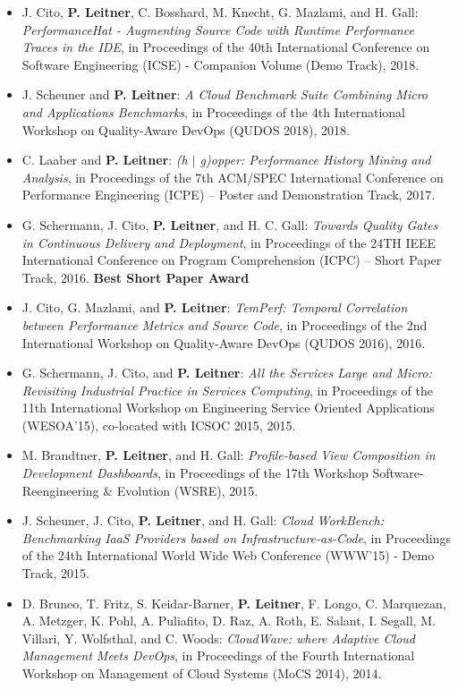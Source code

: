 \documentclass[paper=letter,fontsize=11pt]{scrartcl} %
\begin{document}
\begin{itemize}
	\item J. Cito, \textbf{P. Leitner}, C. Bosshard, M. Knecht, G. Mazlami, and H. Gall: \emph{PerformanceHat - Augmenting Source Code with Runtime Performance Traces in the IDE}, in Proceedings of the 40th International Conference on Software Engineering (ICSE) - Companion Volume (Demo Track), 2018.
	\item J. Scheuner and \textbf{P. Leitner}: \emph{A Cloud Benchmark Suite Combining Micro and Applications Benchmarks}, in Proceedings of the 4th International Workshop on Quality-Aware DevOps (QUDOS 2018), 2018.
	\item C. Laaber and \textbf{P. Leitner}: \emph{ (h $|$ g)opper: Performance History Mining and Analysis},  in Proceedings of the 7th ACM/SPEC International Conference on Performance Engineering (ICPE) -- Poster and Demonstration Track, 2017.
	\item G. Schermann, J. Cito, \textbf{P. Leitner}, and H. C. Gall: \emph{Towards Quality Gates in Continuous Delivery and Deployment}, in Proceedings of the 24TH IEEE International Conference on Program Comprehension (ICPC) – Short Paper Track, 2016. \textbf{Best Short Paper Award}
	\item J. Cito, G. Mazlami, and \textbf{P. Leitner}: \emph{TemPerf: Temporal Correlation between Performance Metrics and Source Code}, in Proceedings of the 2nd International Workshop on Quality-Aware DevOps (QUDOS 2016), 2016.
    \item G. Schermann, J. Cito, and \textbf{P. Leitner}: \emph{All the Services Large and Micro: Revisiting Industrial Practice in Services Computing}, in Proceedings of the 11th International Workshop on Engineering Service Oriented Applications (WESOA’15), co-located with ICSOC 2015, 2015.
    \item M. Brandtner, \textbf{P. Leitner}, and H. Gall: \emph{Profile-based View Composition in Development Dashboards}, in Proceedings of the 17th Workshop Software-Reengineering \& Evolution (WSRE), 2015.
  \item J. Scheuner, J. Cito, \textbf{P. Leitner}, and H. Gall: \emph{Cloud WorkBench: Benchmarking IaaS Providers based on Infrastructure-as-Code}, in Proceedings of the 24th International World Wide Web Conference (WWW'15) - Demo Track, 2015.
 \item D. Bruneo, T. Fritz, S. Keidar-Barner, \textbf{P. Leitner}, F. Longo, C. Marquezan, A. Metzger, K. Pohl, A. Puliafito, D. Raz, A. Roth, E. Salant, I. Segall, M. Villari, Y. Wolfsthal, and C. Woods: \emph{CloudWave: where Adaptive Cloud Management Meets DevOps}, in Proceedings of the Fourth International Workshop on Management of Cloud Systems (MoCS 2014), 2014.

\end{itemize}
\end{document}
